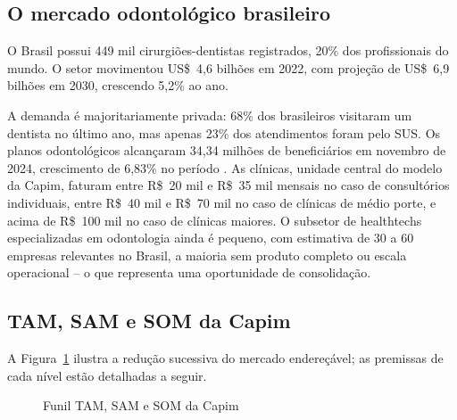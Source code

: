 \subsection{O mercado odontológico brasileiro}

O Brasil possui 449 mil cirurgiões-dentistas registrados, 20\% dos profissionais do mundo. O setor movimentou US\$~4,6 bilhões em 2022, com projeção de US\$~6,9 bilhões em 2030, crescendo 5,2\% ao ano.

A demanda é majoritariamente privada: 68\% dos brasileiros visitaram um dentista no último ano, mas apenas 23\% dos atendimentos foram pelo SUS. Os planos odontológicos alcançaram 34,34 milhões de beneficiários em novembro de 2024, crescimento de 6,83\% no período \cite{cfo2024, grandviewresearch2023, ans2024}. As clínicas, unidade central do modelo da Capim, faturam entre R\$~20 mil e R\$~35 mil mensais no caso de consultórios individuais, entre R\$~40 mil e R\$~70 mil no caso de clínicas de médio porte, e acima de R\$~100 mil no caso de clínicas maiores. O subsetor de healthtechs especializadas em odontologia ainda é pequeno, com estimativa de 30 a 60 empresas relevantes no Brasil, a maioria sem produto completo ou escala operacional -- o que representa uma oportunidade de consolidação.

\subsection{TAM, SAM e SOM da Capim}

A Figura~\ref{fig:tam-sam-som} ilustra a redução sucessiva do mercado endereçável; as premissas de cada nível estão detalhadas a seguir.

\begin{figure}[h]
  \caption{Funil TAM, SAM e SOM da Capim}
  \label{fig:tam-sam-som}
  \centering
\end{figure}

